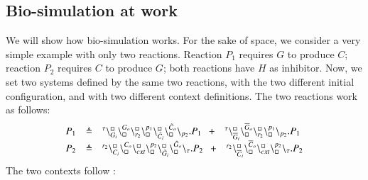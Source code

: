 \subsection{Bio-simulation at work}

We will show how bio-simulation works. For the sake of space, we consider a  very simple
 example with only two reactions. 
Reaction $P_1$ requires $G$  to produce $C$; reaction $P_2$
requires $C$ to produce $G$; 
both reactions have $H$ as inhibitor.
Now, we set two systems defined by the same two reactions, with the two different initial configuration, and with two different context definitions.
The two reactions work as follows:
\[
\begin{array}{lcl}
P_1 & \defeq &\startchain{\silent}\chainedlink{G_i}{\noact}\chainedlink{\noact}{G_o}
					        \chainedlink{r_{2}}{\noact}\chainedlink{\noact}{p_1}
					        \chainedlink{\tilde{C}_i}{\noact}\chainedlink{\noact}{\tilde{C}_o}
			\chainend{p_{2}}.P_1  \   \
			 +\ 
					\ \  \startchain{\silent}\chainedlink{\overline{G}_i}{\noact}\chainedlink{\noact}{\overline{G}_o}\chainedlink{r_{2}}{\noact}\chainedlink{\noact}{p_1} \chainend{p_{2}}.P_1\\
					P_2 & \defeq &\startchain{r_2}\chainedlink{C_i}{\noact}\chainedlink{\noact}{C_o}
					        \chainedlink{cxt}{\noact}\chainedlink{\noact}{p_2}
					        \chainedlink{\tilde{G}_i}{\noact}\chainedlink{\noact}{\tilde{G}_o}
			\chainend{\silent}.P_2  \   \
			 +\ 
					\ \  \startchain{r_2}\chainedlink{\overline{C}_i}{\noact}\chainedlink{\noact}{\overline{C}_o}\chainedlink{cxt}{\noact}\chainedlink{\noact}{p_2} \chainend{\silent}.P_2
			\end{array}
\]
The two contexts follow :\\
